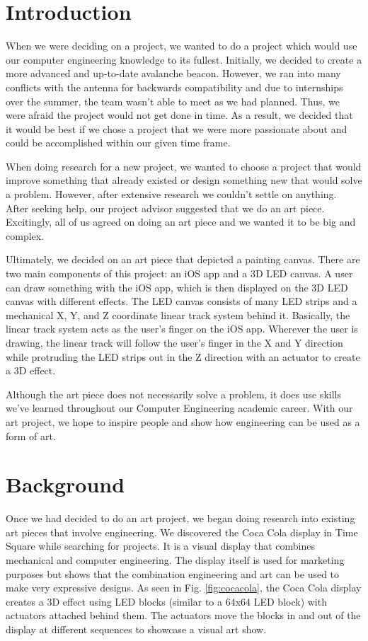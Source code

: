 \documentclass[11pt]{IEEEtran}
\begin{document}
\section{Introduction}
When we were deciding on a project, we wanted to do a project which would use our computer engineering knowledge to its fullest. Initially, we decided to create a more advanced and up-to-date avalanche beacon. However, we ran into many conflicts with the antenna for backwards compatibility and due to internships over the summer, the team wasn’t able to meet as we had planned. Thus, we were afraid the project would not get done in time. As a result, we decided that it would be best if we chose a project that we were more passionate about and could be accomplished within our given time frame. 

When doing research for a new project, we wanted to choose a project that would improve something that already existed or design something new that would solve a problem. However, after extensive research we couldn’t settle on anything. After seeking help, our project advisor suggested that we do an art piece. Excitingly, all of us agreed on doing an art piece and we wanted it to be big and complex. 

Ultimately, we decided on an art piece that depicted a painting canvas. There are two main components of this project: an iOS app and a 3D LED canvas. A user can draw something with the iOS app, which is then displayed on the 3D LED canvas with different effects. The LED canvas consists of many LED strips and a mechanical X, Y, and Z coordinate linear track system behind it. Basically, the linear track system acts as the user’s finger on the iOS app. Wherever the user is drawing, the linear track will follow the user’s finger in the X and Y direction while protruding the LED strips out in the Z direction with an actuator to create a 3D effect. 

Although the art piece does not necessarily solve a problem, it does use skills we’ve learned throughout our Computer Engineering academic career. With our art project, we hope to inspire people and show how engineering can be used as a form of art.

\section{Background}
Once we had decided to do an art project, we began doing research into existing art pieces that involve engineering. We discovered the  Coca Cola display in Time Square while searching for projects. It is a visual display that combines mechanical and computer engineering. The display itself is used for marketing purposes but shows that the combination engineering and art can be used to make very expressive designs. As seen in Fig. \ref{fig:cocacola}, the Coca Cola display creates a 3D effect using LED blocks (similar to a 64x64 LED block) with actuators attached behind them. The actuators move the blocks in and out of the display at different sequences to showcase a visual art show.
\end{document}
